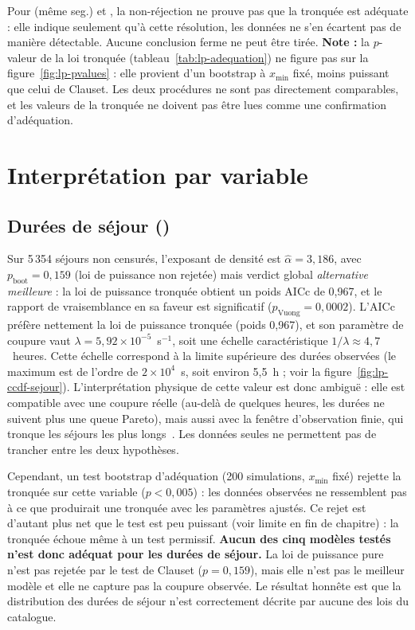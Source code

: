 \documentclass[12pt,a4paper]{report}
\theoremstyle{definition}
\DeclareRobustCommand{\code}[1]{\texorpdfstring{\texttt{\detokenize{#1}}}{\detokenize{#1}}}
\begin{document}
Pour \code{distance} (même seg.) et \code{sejour_avec_censurees}, la non-réjection
ne prouve pas que la tronquée est adéquate : elle indique seulement qu'à cette
résolution, les données ne s'en écartent pas de manière détectable. Aucune conclusion
ferme ne peut être tirée. \textbf{Note :} la $p$-valeur de la loi tronquée
(tableau~\ref{tab:lp-adequation}) ne figure pas sur la figure~\ref{fig:lp-pvalues} :
elle provient d'un bootstrap à $x_{\min}$ fixé, moins puissant que celui de Clauset.
Les deux procédures ne sont pas directement comparables, et les valeurs de la tronquée
ne doivent pas être lues comme une confirmation d'adéquation.

\section{Interprétation par variable}

\subsection{Durées de séjour (\code{sejour})}

Sur 5\,354 séjours non censurés, l'exposant de densité est $\hat\alpha = 3{,}186$, avec
$p_{\text{boot}} = 0{,}159$ (loi de puissance non rejetée) mais verdict global
\emph{alternative meilleure} : la loi de puissance tronquée obtient un poids AICc de
0{,}967, et le rapport de vraisemblance en sa faveur est significatif
($p_{\text{Vuong}} = 0{,}0002$). L'AICc préfère nettement la loi de puissance tronquée
(poids 0{,}967), et son paramètre de coupure vaut $\lambda = 5{,}92 \times 10^{-5}$~s$^{-1}$,
soit une échelle caractéristique $1/\lambda \approx 4{,}7$~heures. Cette échelle
correspond à la limite supérieure des durées observées (le maximum est de l'ordre de
$2 \times 10^4$~s, soit environ 5{,}5~h ; voir la figure~\ref{fig:lp-ccdf-sejour}).
L'interprétation physique de cette valeur est donc ambiguë : elle est compatible avec une
coupure réelle (au-delà de quelques heures, les durées ne suivent plus une queue
Pareto), mais aussi avec la fenêtre d'observation finie, qui tronque les séjours les
plus longs~\cite{kivela2015}. Les données seules ne permettent pas de trancher entre les
deux hypothèses.

Cependant, un test bootstrap d'adéquation (200 simulations, $x_{\min}$ fixé) rejette la
tronquée sur cette variable ($p<0{,}005$) : les données observées ne ressemblent pas à
ce que produirait une tronquée avec les paramètres ajustés. Ce rejet est d'autant plus
net que le test est peu puissant (voir limite en fin de chapitre) : la tronquée échoue
même à un test permissif. \textbf{Aucun des cinq modèles testés n'est donc adéquat pour
les durées de séjour.} La loi de puissance pure n'est pas rejetée par le test de Clauset
($p=0{,}159$), mais elle n'est pas le meilleur modèle et elle ne capture pas la coupure
observée. Le résultat honnête est que la distribution des durées de séjour n'est
correctement décrite par aucune des lois du catalogue.
\end{document}
